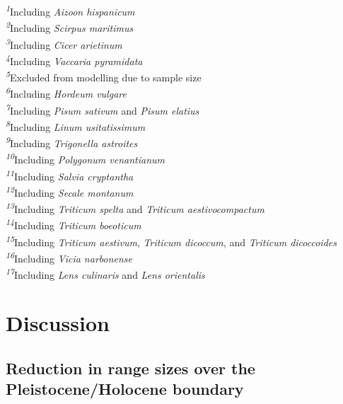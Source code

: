 \documentclass[
  authoryear,
  preprint]{elsarticle}
\begin{document}
\begin{minipage}{\linewidth}
\textsuperscript{\textit{1}}Including \emph{Aizoon hispanicum}\\
\textsuperscript{\textit{2}}Including \emph{Scirpus maritimus}\\
\textsuperscript{\textit{3}}Including \emph{Cicer arietinum}\\
\textsuperscript{\textit{4}}Including \emph{Vaccaria pyramidata}\\
\textsuperscript{\textit{5}}Excluded from modelling due to sample size\\
\textsuperscript{\textit{6}}Including \emph{Hordeum vulgare}\\
\textsuperscript{\textit{7}}Including \emph{Pisum sativum} and \emph{Pisum elatius}\\
\textsuperscript{\textit{8}}Including \emph{Linum usitatissimum}\\
\textsuperscript{\textit{9}}Including \emph{Trigonella astroites}\\
\textsuperscript{\textit{10}}Including \emph{Polygonum venantianum}\\
\textsuperscript{\textit{11}}Including \emph{Salvia cryptantha}\\
\textsuperscript{\textit{12}}Including \emph{Secale montanum}\\
\textsuperscript{\textit{13}}Including \emph{Triticum spelta} and \emph{Triticum aestivocompactum}\\
\textsuperscript{\textit{14}}Including \emph{Triticum boeoticum}\\
\textsuperscript{\textit{15}}Including \emph{Triticum aestivum}, \emph{Triticum dicoccum}, and \emph{Triticum dicoccoides}\\
\textsuperscript{\textit{16}}Including \emph{Vicia narbonense}\\
\textsuperscript{\textit{17}}Including \emph{Lens culinaris} and \emph{Lens orientalis}\\
\end{minipage}
\endgroup

\section{Discussion}\label{discussion}

\subsection{Reduction in range sizes over the Pleistocene/Holocene
boundary}\label{reduction-in-range-sizes-over-the-pleistoceneholocene-boundary}
\end{document}
